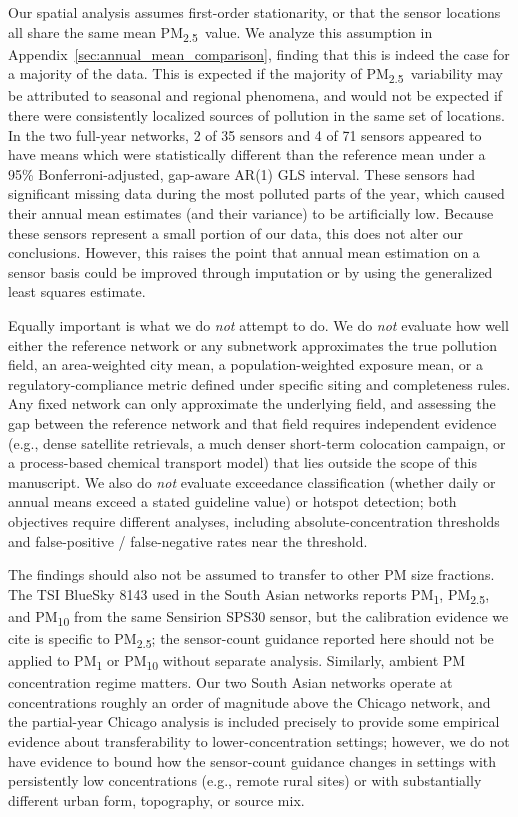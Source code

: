\documentclass[12pt]{article}
\theoremstyle{remark}
\newcommand{\pmtt}{\textrm{PM\textsubscript{2.5}}}
\newcommand{\city}[1]{\capitalisewords{\MakeLowercase{#1}}}
\begin{document}
Our spatial analysis assumes first-order stationarity, or that the sensor locations all share the same mean \pmtt\ value. We analyze this assumption in Appendix~\ref{sec:annual_mean_comparison}, finding that this is indeed the case for a majority of the data. This is expected if the majority of \pmtt\ variability may be attributed to seasonal and regional phenomena, and would not be expected if there were consistently localized sources of pollution in the same set of locations. In the two full-year networks, 2 of 35 \city{Dhaka} sensors and 4 of 71 \city{Lucknow} sensors appeared to have means which were statistically different than the reference mean under a 95\% Bonferroni-adjusted, gap-aware AR(1) GLS interval. These sensors had significant missing data during the most polluted parts of the year, which caused their annual mean estimates (and their variance) to be artificially low. Because these sensors represent a small portion of our data, this does not alter our conclusions. However, this raises the point that annual mean estimation on a sensor basis could be improved through imputation or by using the generalized least squares estimate.

Equally important is what we do \emph{not} attempt to do. We do \emph{not} evaluate how well either the reference network or any subnetwork approximates the true pollution field, an area-weighted city mean, a population-weighted exposure mean, or a regulatory-compliance metric defined under specific siting and completeness rules. Any fixed network can only approximate the underlying field, and assessing the gap between the reference network and that field requires independent evidence (e.g., dense satellite retrievals, a much denser short-term colocation campaign, or a process-based chemical transport model) that lies outside the scope of this manuscript. We also do \emph{not} evaluate exceedance classification (whether daily or annual means exceed a stated guideline value) or hotspot detection; both objectives require different analyses, including absolute-concentration thresholds and false-positive / false-negative rates near the threshold.

The findings should also not be assumed to transfer to other PM size fractions. The TSI BlueSky 8143 used in the South Asian networks reports PM\textsubscript{1}, \pmtt, and PM\textsubscript{10} from the same Sensirion SPS30 sensor, but the calibration evidence we cite is specific to \pmtt; the sensor-count guidance reported here should not be applied to PM\textsubscript{1} or PM\textsubscript{10} without separate analysis. Similarly, ambient PM concentration regime matters. Our two South Asian networks operate at concentrations roughly an order of magnitude above the Chicago network, and the partial-year Chicago analysis is included precisely to provide some empirical evidence about transferability to lower-concentration settings; however, we do not have evidence to bound how the sensor-count guidance changes in settings with persistently low concentrations (e.g., remote rural sites) or with substantially different urban form, topography, or source mix.
\end{document}
